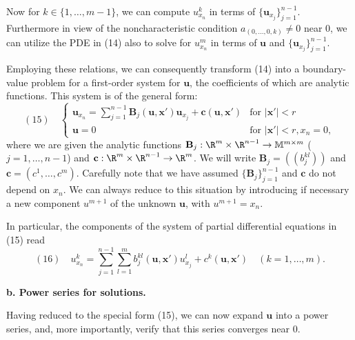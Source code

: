 Now for $k\in\{1,\ldots,m-1\}$, we can compute $u^k_{x_n}$ in terms of $\{\mathbf{u}_{x_j}\}_{j=1}^{n-1}$. Furthermore in view of the noncharacteristic condition $a_{(0,\ldots,0,k)}\neq 0$ near $0$, we can utilize the PDE in (14) also to solve for $u_{x_n}^m$ in terms of $\mathbf{u}$ and $\{\mathbf{u}_{x_j}\}_{j=1}^{n-1}$.

Employing these relations, we can consequently transform (14) into a boundary-value problem for a first-order system for $\mathbf{u}$, the coefficients of which are analytic functions. This system is of the general form:
$$(15) \quad \begin{cases}
\mathbf{u}_{x_n} = \sum_{j=1}^{n-1} \mathbf{B}_j(\mathbf{u}, \mathbf{x}')\mathbf{u}_{x_j} + \mathbf{c}(\mathbf{u}, \mathbf{x}') & \text{for } |\mathbf{x}'| < r \\
\mathbf{u} = 0 & \text{for } |\mathbf{x}'| < r, x_n = 0,
\end{cases}$$
where we are given the analytic functions $\mathbf{B}_j : \R^m \times \R^{n-1} \to \mathbb{M}^{m \times m}$ ($j = 1,\ldots,n-1$) and $\mathbf{c} : \R^m \times \R^{n-1} \to \R^m$. We will write $\mathbf{B}_j = ((b_j^{kl}))$ and $\mathbf{c} = (c^1,\ldots,c^m)$. Carefully note that we have assumed $\{\mathbf{B}_j\}_{j=1}^{n-1}$ and $\mathbf{c}$ do not depend on $x_n$. We can always reduce to this situation by introducing if necessary a new component $u^{m+1}$ of the unknown $\mathbf{u}$, with $u^{m+1} = x_n$.

In particular, the components of the system of partial differential equations in (15) read
$$(16) \quad u_{x_n}^k = \sum_{j=1}^{n-1}\sum_{l=1}^m b_j^{kl}(\mathbf{u},\mathbf{x}')u_{x_j}^l + c^k(\mathbf{u}, \mathbf{x}') \quad (k = 1,\ldots,m).$$

\textbf{b. Power series for solutions.}

Having reduced to the special form (15), we can now expand $\mathbf{u}$ into a power series, and, more importantly, verify that this series converges near 0.

